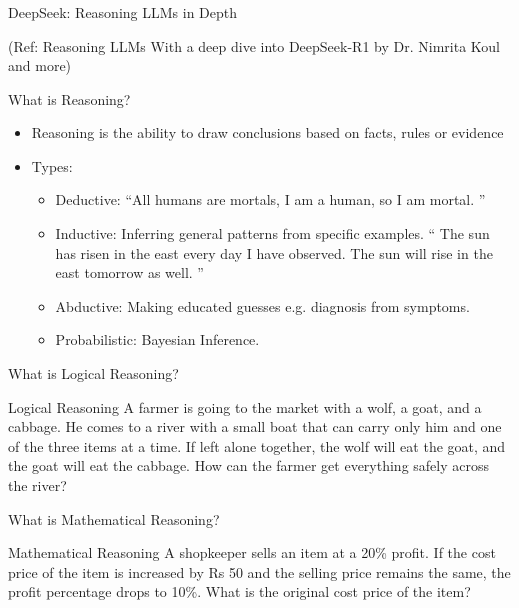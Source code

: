 \begin{frame}[fragile]\frametitle{}
\begin{center}
{\Large DeepSeek: Reasoning LLMs in Depth}

{\tiny (Ref: Reasoning LLMs With a deep dive into DeepSeek-R1 by Dr. Nimrita Koul and more)}

\end{center}


\end{frame}


\begin{frame}[fragile]{What is Reasoning?}
    \begin{itemize}
        \item Reasoning is the ability to draw conclusions based on facts, rules or evidence
		\item Types:
			    \begin{itemize}
				\item  Deductive: ``All humans are mortals, I am a human, so I am mortal. ''
				\item  Inductive: Inferring general patterns from specific examples. `` The sun has risen in the east every day I have observed. The sun will rise in the east tomorrow as well. ''
				\item  Abductive: Making educated guesses e.g. diagnosis from symptoms.
				\item  Probabilistic: Bayesian Inference.
			\end{itemize}
    \end{itemize}
\end{frame}

\begin{frame}[fragile]{What is Logical Reasoning?}
    \begin{block}{Logical Reasoning}
		A farmer is going to the market with a wolf, a goat, 
		and a cabbage. He comes to a river with a small boat 
		that can carry only him and one of the three items at 
		a time. If left alone together, the wolf will eat the goat, 
		and the goat will eat the cabbage. How can the 
		farmer get everything safely across the river?
    \end{block}
\end{frame}

\begin{frame}[fragile]{What is Mathematical Reasoning?}
    \begin{block}{Mathematical Reasoning}
		 A shopkeeper sells an item at a 20\% profit. If the 
		cost price of the item is increased by Rs 50 and the 
		selling price remains the same, the profit 
		percentage drops to 10\%. What is the original cost 
		price of the item?
    \end{block}
\end{frame}

